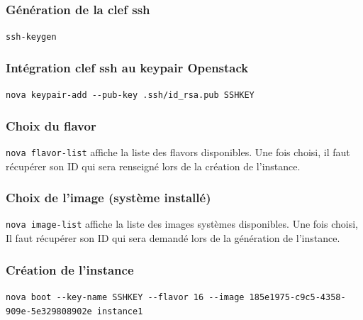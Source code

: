 \documentclass[]{article}
\begin{document}
\subsubsection{Génération de la clef
ssh}\label{guxe9nuxe9ration-de-la-clef-ssh}

\texttt{ssh-keygen}

\subsubsection{Intégration clef ssh au keypair
Openstack}\label{intuxe9gration-clef-ssh-au-keypair-openstack}

\texttt{nova\ keypair-add\ -\/-pub-key\ .ssh/id\_rsa.pub\ SSHKEY}

\subsubsection{Choix du flavor}\label{choix-du-flavor}

\texttt{nova\ flavor-list} affiche la liste des flavors disponibles. Une
fois choisi, il faut récupérer son ID qui sera renseigné lors de la
création de l'instance.

\subsubsection{Choix de l'image (système
installé)}\label{choix-de-limage-systuxe8me-installuxe9}

\texttt{nova\ image-list} affiche la liste des images systèmes
disponibles. Une fois choisi, Il faut récupérer son ID qui sera demandé
lors de la génération de l'instance.

\subsubsection{Création de l'instance}\label{cruxe9ation-de-linstance-1}

\texttt{nova\ boot\ -\/-key-name\ SSHKEY\ -\/-flavor\ 16\ -\/-image\ 185e1975-c9c5-4358-909e-5e329808902e\ instance1}
\end{document}
